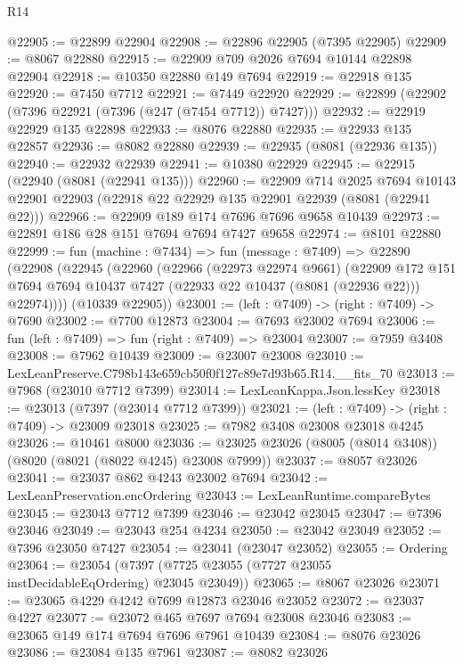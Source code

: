 \begin{lexlean}{R14}
\begin{coremodule}
@22905 := @22899 @22904
@22908 := @22896 @22905 (@7395 @22905)
@22909 := @8067 @22880
@22915 := @22909 @709 @2026 @7694 @10144 @22898 @22904
@22918 := @10350 @22880 @149 @7694
@22919 := @22918 @135
@22920 := @7450 @7712
@22921 := @7449 @22920
@22929 := @22899 (@22902 (@7396 @22921 (@7396 (@247 (@7454 @7712)) @7427)))
@22932 := @22919 @22929 @135 @22898
@22933 := @8076 @22880
@22935 := @22933 @135 @22857
@22936 := @8082 @22880
@22939 := @22935 (@8081 (@22936 @135))
@22940 := @22932 @22939
@22941 := @10380 @22929
@22945 := @22915 (@22940 (@8081 (@22941 @135)))
@22960 := @22909
    @714
    @2025
    @7694
    @10143
    @22901
    @22903
    (@22918 @22 @22929 @135 @22901 @22939 (@8081 (@22941 @22)))
@22966 := @22909 @189 @174 @7696 @7696 @9658 @10439
@22973 := @22891 @186 @28 @151 @7694 @7694 @7427 @9658
@22974 := @8101 @22880
@22999 := fun (machine : @7434) =>
  fun (message : @7409) =>
  @22890
    (@22908
      (@22945
        (@22960
          (@22966
            (@22973 @22974 @9661)
            (@22909
              @172
              @151
              @7694
              @7694
              @10437
              @7427
              (@22933 @22 @10437 (@8081 (@22936 @22)))
              @22974))))
      (@10339 @22905))
@23001 := (left : @7409) -> (right : @7409) -> @7690
@23002 := @7700 @12873
@23004 := @7693 @23002 @7694
@23006 := fun (left : @7409) => fun (right : @7409) => @23004
@23007 := @7959 @3408
@23008 := @7962 @10439
@23009 := @23007 @23008
@23010 := LexLeanPreserve.C798b143e659cb50f0f127c89e7d93b65.R14.__fits_70
@23013 := @7968 (@23010 @7712 @7399)
@23014 := LexLeanKappa.Json.lessKey
@23018 := @23013 (@7397 (@23014 @7712 @7399))
@23021 := (left : @7409) -> (right : @7409) -> @23009 @23018
@23025 := @7982 @3408 @23008 @23018 @4245
@23026 := @10461 @8000
@23036 := @23025 @23026 (@8005 (@8014 @3408)) (@8020 (@8021 (@8022 @4245) @23008 @7999))
@23037 := @8057 @23026
@23041 := @23037 @862 @4243 @23002 @7694
@23042 := LexLeanPreservation.encOrdering
@23043 := LexLeanRuntime.compareBytes
@23045 := @23043 @7712 @7399
@23046 := @23042 @23045
@23047 := @7396 @23046
@23049 := @23043 @254 @4234
@23050 := @23042 @23049
@23052 := @7396 @23050 @7427
@23054 := @23041 (@23047 @23052)
@23055 := Ordering
@23064 := @23054 (@7397 (@7725 @23055 (@7727 @23055 instDecidableEqOrdering) @23045 @23049))
@23065 := @8067 @23026
@23071 := @23065 @4229 @4242 @7699 @12873 @23046 @23052
@23072 := @23037 @4227
@23077 := @23072 @465 @7697 @7694 @23008 @23046
@23083 := @23065 @149 @174 @7694 @7696 @7961 @10439
@23084 := @8076 @23026
@23086 := @23084 @135 @7961
@23087 := @8082 @23026

\end{coremodule}
\end{lexlean}
